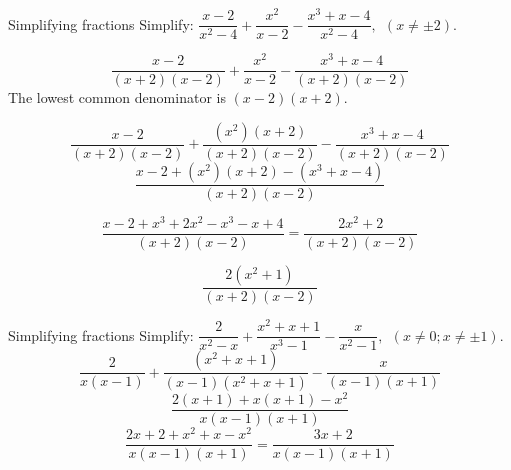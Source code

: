       
\begin{wex}{Simplifying fractions}
{Simplify: $\dfrac{x-2}{{x}^{2}-4}+\dfrac{{x}^{2}}{x-2}-\dfrac{{x}^{3}+x-4}{{x}^{2}-4}, ~~(x \neq \pm2)$.}
{
\begin{equation*}
\frac{x-2}{(x+2)(x-2)}+\frac{{x}^{2}}{x-2}-\frac{{x}^{3}+x-4}{(x+2)(x-2)}
\end{equation*}
 The lowest common denominator is $(x-2)(x+2)$. 

\begin{equation*}
\frac{x-2}{(x+2)(x-2)}+\frac{({x}^{2})
(x+2)}{(x+2)(x-2)}-\frac{{x}^{3}+x-4}{(x+2)(x-2)}
\end{equation*}
\begin{equation*}
\frac{x-2+({x}^{2})(x+2)-(x^{3}+x-4)}{(x+2)(x-2)}
\end{equation*}

\begin{equation*}
  \dfrac{x-2+{x}^{3}+ 2x^{2}-x^{3} - x+4}{(x+2)(x-2)} = \dfrac{2x^{2} + 2}{(x+2)(x-2)}
\end{equation*}

\begin{equation*}
\dfrac{2({x}^{2}
+1)}{(x+2)(x-2)}
\end{equation*}
}
\end{wex}

\begin{wex}{Simplifying fractions}
{Simplify: $\dfrac{2}{{x}^{2}-x}+\dfrac{x^{2}+x+1}{x^{3}-1}-\dfrac{x}{{x}^{2}-1}, ~~(x \neq 0;x \neq \pm1)$.}
{
\begin{equation*}
  \dfrac{2}{x(x-1)}+ \dfrac{({x}^{2} + x + 1)}{(x-1)(x^{2}+x+1)}-\dfrac{x}{(x-1)(x+1)}
\end{equation*}
\begin{equation*}
  \dfrac{2(x+1)+x(x+1)-x^{2}}{x(x-1)(x+1)}
\end{equation*}
\begin{equation*}
  \dfrac{2x+2 + x^{2} + x - x^{2}}{x(x-1)(x+1)} = \dfrac{3x+2}{x(x-1)(x+1)}
\end{equation*}
}
\end{wex}



